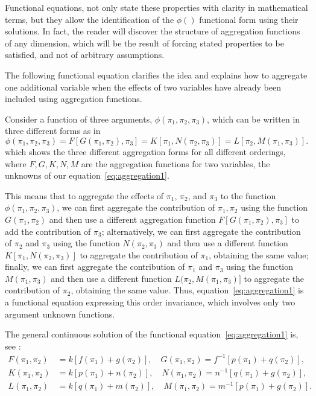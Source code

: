 \documentclass[
	11pt, %
	fleqn, %
	a4paper, %
]{LegrandOrangeBook}
\begin{document}
Functional equations, not only state these properties with clarity in mathematical terms, but they allow the identification of the $\phi()$ functional form using their solutions. In fact, the reader will discover the structure of aggregation functions of any dimension, which will be the result of forcing stated properties to be satisfied, and not of arbitrary assumptions.

The following functional equation clarifies the idea and explains how to aggregate one additional variable when the effects of two variables have already been included using aggregation functions.

Consider a function of three arguments, $\phi(\pi_1,\pi_2,\pi_3)$, which can be written in three different forms as in
\begin{equation}
\phi(\pi_1,\pi_2,\pi_3) = F[G(\pi_1,\pi_2),\pi_3]
= K[\pi_1,N(\pi_2,\pi_3)]
= L[\pi_2,M(\pi_1,\pi_3)]. \label{eq:agg1}
\end{equation}
which shows the three different aggregation forms for all different orderings, where $F, G, K, N, M$ are the aggregation functions for two variables, the unknowns of our equation~\eqref{eq:aggregation1}.

This means that to aggregate the effects of $\pi_1$, $\pi_2$, and $\pi_3$ to the function $\phi(\pi_1, \pi_2,\pi_3)$, we can first aggregate the contribution of $\pi_1,\pi_2$ using the function $G(\pi_1,\pi_2)$ and then use a different aggregation function $F[G(\pi_1,\pi_2),\pi_3]$ to add the contribution of $\pi_3$; alternatively, we can first aggregate the contribution of $\pi_2$ and $\pi_3$ using the function $N(\pi_2,\pi_3)$ and then use a different function $K[\pi_1,N(\pi_2,\pi_3)]$ to aggregate the contribution of $\pi_1$, obtaining the same value; finally, we can first aggregate the contribution of $\pi_1$ and $\pi_3$ using the function $M(\pi_1,\pi_3)$ and then use a different function $L(\pi_2, M(\pi_1,\pi_3)]$ to aggregate the contribution of $\pi_2$, obtaining the same value. Thus, equation~\eqref{eq:aggregation1} is a functional equation expressing this order invariance, which involves only two argument unknown functions.

The general continuous solution of the functional equation~\eqref{eq:aggregation1} is, see \cite{castillo2004functional}:
\begin{align}
F(\pi_1,\pi_2) &= k[f(\pi_1) + g(\pi_2)], \quad G(\pi_1,\pi_2) = f^{-1}[p(\pi_1) + q(\pi_2)],\\
K(\pi_1,\pi_2) &= k[p(\pi_1) + n(\pi_2)], \quad N(\pi_1,\pi_2) = n^{-1}[q(\pi_1) + g(\pi_2)],\\
L(\pi_1,\pi_2) &= k[q(\pi_1) + m(\pi_2)], \quad M(\pi_1,\pi_2) = m^{-1}[p(\pi_1) + g(\pi_2)].
\end{align}
\end{document}
